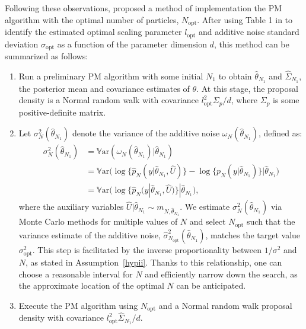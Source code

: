 \documentclass[pdflatex,sn-mathphys-num]{sn-jnl}
\newcommand{\Var}{\mathbb{V}\text{ar}}
\theoremstyle{thmstyleone}
\theoremstyle{thmstyletwo}
\theoremstyle{thmstylethree}
\begin{document}
Following these observations, \cite{schmon_large-sample_2021} proposed a method of implementation the PM algorithm with the optimal number of particles, $N_{\text{opt}}$. After using Table 1 in \cite{schmon_large-sample_2021} to identify the estimated optimal scaling parameter $l_\text{opt}$ and additive noise standard deviation $\sigma_\text{opt}$ as a function of the parameter dimension $d$, this method can be summarized as follows:
\begin{enumerate}
    \item Run a preliminary PM algorithm with some initial $N_1$ to obtain $\hat \theta_{N_1}$ and $\widehat \Sigma_{N_1}$, the posterior mean and covariance estimates of $\theta$. At this stage, the proposal density is a Normal random walk with covariance ${l_{\text{opt}}^2 \Sigma_p}/{d}$, where $\Sigma_p$ is some positive-definite matrix.
    \label{step1}

    \item Let $\sigma_N^2(\hat \theta_{N_1})$ denote the variance of the additive noise $\omega_N(\hat \theta_{N_1})$, defined as:
    \begin{align}
        \sigma_N^2(\hat \theta_{N_1}) &= \Var(\omega_N(\hat \theta_{N_1})|\hat \theta_{N_1})\nonumber \\
        &= \Var\big(\log\{\widehat p_N(y |\hat \theta_{N_1}, \widehat U)\}- \log\{p_N(y |\hat \theta_{N_1})\}\big|\hat \theta_{N_1}\big) \nonumber\\
        &= \Var\big(\log\{\widehat p_N(y |\hat \theta_{N_1}, \widehat U)\}|\hat \theta_{N_1}\big),
        \label{estimationsd}
    \end{align}
    where the auxiliary variables $\widehat U|\hat\theta_{N_1} \sim m_{N, \hat \theta_{N_1}}$. 
    We estimate $\sigma_N^2(\hat \theta_{N_1})$ via Monte Carlo methods for multiple values of $N$ and select $N_{\text{opt}}$ such that the variance estimate of the additive noise, $\hat \sigma_{N_{\text{opt}}}^2(\hat \theta_{N_1})$, matches the target value $\sigma_{\text{opt}}^2$. 
    This step is facilitated by the inverse proportionality between $1/\sigma^2$ and $N$, as stated in Assumption~\eqref{hypii}. Thanks to this relationship, one can choose a reasonable interval for $N$ and efficiently narrow down the search, as the approximate location of the optimal $N$ can be anticipated.
    \label{step2}
    
    \item Execute the PM algorithm using $N_{\text{opt}}$ and a Normal random walk proposal density with covariance ${l_{\text{opt}}^2\widehat \Sigma_{N_1}}/{d}$.
    \label{step3}
    \label{NAmethod}
\end{enumerate}
\end{document}
